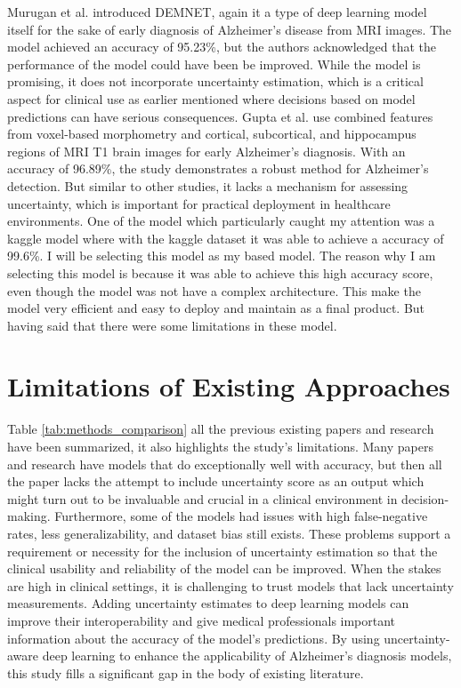 \documentclass[12pt,onecolumn]{report}
\begin{document}
Murugan et al. \cite{Murugan2021} introduced DEMNET, again it a type of deep learning model itself for the sake of early diagnosis of Alzheimer’s disease from MRI images. The model achieved an accuracy of 95.23\%, but the authors acknowledged that the performance of the model could have been be improved. While the model is promising, it does not incorporate uncertainty estimation, which is a critical aspect for clinical use as earlier mentioned where decisions based on model predictions can have serious consequences. Gupta et al. \cite{Gupta2019} use combined features from voxel-based morphometry and cortical, subcortical, and hippocampus regions of MRI T1 brain images for early Alzheimer’s diagnosis. With an accuracy of 96.89\%, the study demonstrates a robust method for Alzheimer’s detection. But similar to other studies, it lacks a mechanism for assessing uncertainty, which is important for practical deployment in healthcare environments. One of the model which particularly caught my attention was a kaggle model where with the kaggle dataset it was able to achieve a accuracy of 99.6\%. I will be selecting this model as my based model. The reason why I am selecting this model is because it was able to achieve this high accuracy score, even though the model was not have a complex architecture. This make the model very efficient and easy to deploy and maintain as a final product. But having said that there were some limitations in these model.

\section{Limitations of Existing Approaches}
Table \ref{tab:methods_comparison} all the previous existing papers and research have been summarized, it also highlights the study's limitations. Many papers and research have models that do exceptionally well with accuracy, but then all the paper lacks the attempt to include uncertainty score as an output which might turn out to be invaluable and crucial in a clinical environment in decision-making. Furthermore, some of the models had issues with high false-negative rates, less generalizability, and dataset bias still exists. These problems support a requirement or necessity for the inclusion of uncertainty estimation so that the clinical usability and reliability of the model can be improved. When the stakes are high in clinical settings, it is challenging to trust models that lack uncertainty measurements. Adding uncertainty estimates to deep learning models can improve their interoperability and give medical professionals important information about the accuracy of the model's predictions. By using uncertainty-aware deep learning to enhance the applicability of Alzheimer's diagnosis models, this study fills a significant gap in the body of existing literature.
\end{document}
